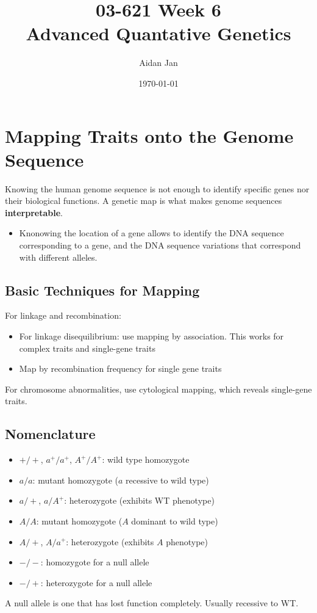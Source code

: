 \documentclass[10pt]{article}
\title{03-621 Week 6 \\ \large{Advanced Quantative Genetics}}
\author{Aidan Jan}
\date{\today}
\begin{document}
\maketitle

\section*{Mapping Traits onto the Genome Sequence}
Knowing the human genome sequence is not enough to identify specific genes nor their biological functions.  A genetic map is what makes genome sequences \textbf{interpretable}.
\begin{itemize}
	\item Knonowing the location of a gene allows to identify the DNA sequence corresponding to a gene, and the DNA sequence variations that correspond with different alleles.
\end{itemize}

\subsection*{Basic Techniques for Mapping}
For linkage and recombination:
\begin{itemize}
	\item For linkage disequilibrium: use mapping by association.  This works for complex traits and single-gene traits
	\item Map by recombination frequency for single gene traits
\end{itemize}
For chromosome abnormalities, use cytological mapping, which reveals single-gene traits.

\subsection*{Nomenclature}
\begin{itemize}
	\item $+/+$, $a^+ / a^+$, $A^+ / A^+$: wild type homozygote
	\item $a / a$: mutant homozygote ($a$ recessive to wild type)
	\item $a / +$, $a / A^+$: heterozygote (exhibits WT phenotype)
	\item $A / A$: mutant homozygote ($A$ dominant to wild type)
	\item $A / +$, $A / a^+$: heterozygote (exhibits $A$ phenotype)
	\item $- / -$: homozygote for a null allele
	\item $- / +$: heterozygote for a null allele
\end{itemize}
A null allele is one that has lost function completely.  Usually recessive to WT.
\end{document}
